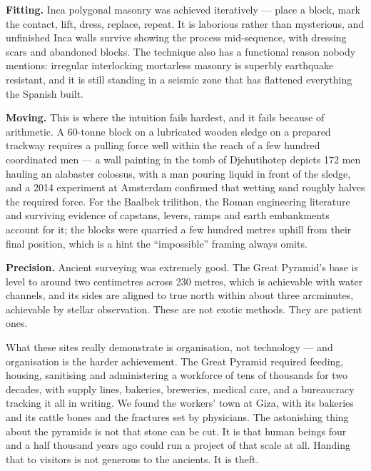 \textbf{Fitting.} Inca polygonal masonry was achieved iteratively --- place a block, mark the
contact, lift, dress, replace, repeat. It is laborious rather than mysterious, and unfinished
Inca walls survive showing the process mid-sequence, with dressing scars and abandoned blocks.
The technique also has a functional reason nobody mentions: irregular interlocking mortarless
masonry is superbly earthquake resistant, and it is still standing in a seismic zone that has
flattened everything the Spanish built.

\textbf{Moving.} This is where the intuition fails hardest, and it fails because of
arithmetic. A 60-tonne block on a lubricated wooden sledge on a prepared trackway requires a
pulling force well within the reach of a few hundred coordinated men --- a wall painting in the
tomb of Djehutihotep depicts 172 men hauling an alabaster colossus, with a man pouring liquid
in front of the sledge, and a 2014 experiment at Amsterdam confirmed that wetting sand roughly
halves the required force. For the Baalbek trilithon, the Roman engineering literature and
surviving evidence of capstans, levers, ramps and earth embankments account for it; the blocks
were quarried a few hundred metres uphill from their final position, which is a hint the
``impossible'' framing always omits.

\textbf{Precision.} Ancient surveying was extremely good. The Great Pyramid's base is level to
around two centimetres across 230 metres, which is achievable with water channels, and its sides
are aligned to true north within about three arcminutes, achievable by stellar observation.
These are not exotic methods. They are patient ones.

\begin{funfact}
What these sites really demonstrate is organisation, not technology --- and organisation is the
harder achievement. The Great Pyramid required feeding, housing, sanitising and administering a
workforce of tens of thousands for two decades, with supply lines, bakeries, breweries,
medical care, and a bureaucracy tracking it all in writing. We found the workers' town at Giza,
with its bakeries and its cattle bones and the fractures set by physicians. The astonishing
thing about the pyramids is not that stone can be cut. It is that human beings four and a half
thousand years ago could run a project of that scale at all. Handing that to visitors is not
generous to the ancients. It is theft.
\end{funfact}

